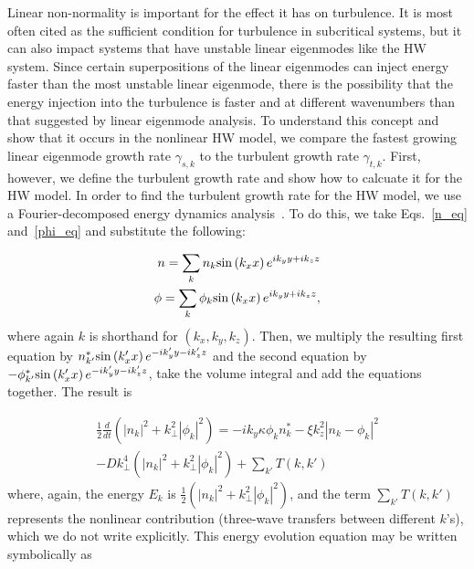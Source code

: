 \documentclass[letter,scriptaddress,twocolumn, prl,showkeys]{revtex4}
\def\beqar{\begin{eqnarray}}
\def\eeqar{\end{eqnarray}}
\newcommand{\diff}[2]{\frac{d#1}{d#2}}
\begin{document}
Linear non-normality is important for the effect it has on turbulence. It is most often cited as the sufficient condition for turbulence in subcritical systems, 
but it can also impact systems that have unstable linear eigenmodes like the HW system. Since certain superpositions of the linear eigenmodes can inject energy faster than the most unstable linear
eigenmode, there is the possibility that the energy injection into the turbulence is faster and at different wavenumbers than that suggested by linear eigenmode analysis. 
To understand this concept and show that it occurs in the nonlinear HW model, we compare the fastest growing linear eigenmode growth rate $\gamma_{s,k}$ to the turbulent growth rate $\gamma_{t,k}$. 
First, however, we define the turbulent growth rate and show how to calcuate it for the HW model.
In order to find the turbulent growth rate for the HW model, we use a Fourier-decomposed energy dynamics analysis~\cite{camargo1995,friedman2012b,friedman2013}. 
To do this, we take Eqs.~\ref{n_eq} and~\ref{phi_eq} and substitute the following:

\beqar
\label{subs_fourier}
n = \sum_{k} n_k {\rm sin} \left( k_x x \right) e^{i k_y y + i k_z z} \\
\phi = \sum_{k} \phi_k {\rm sin} \left( k_x x \right) e^{i k_y y + i k_z z},
\eeqar
where again $k$ is shorthand for $(k_x,k_y,k_z)$.
Then, we multiply the resulting first equation by $n^*_{k'} {\rm sin} \left( k'_x x \right) e^{-i k'_y y - i k'_z z}$ and the second equation by 
$-\phi^*_{k'} {\rm sin} \left( k'_x x \right) e^{-i k'_y y - i k'_z z}$, take the volume integral and add the equations together. The result is

\beqar
\label{Explicit_En_eqn}
\frac{1}{2} \diff{}{t} \left( |n_k|^2 + k^2_\perp |\phi_k|^2 \right) = -i k_y \kappa \phi_k n^*_k - \xi k_z^2 |n_k - \phi_k|^2 \nonumber \\
- D k^4_\perp \left( |n_k|^2 + k^2_\perp |\phi_k|^2 \right) + \sum_{k'} T(k,k')
\eeqar
where, again, the energy $E_k$ is $\frac{1}{2} \left( |n_k|^2 + k^2_\perp |\phi_k|^2 \right)$, 
and the term $\sum_{k'} T(k,k')$ represents the nonlinear contribution (three-wave transfers between different $k$'s), 
which we do not write explicitly. This energy evolution equation may be written symbolically as
\end{document}
